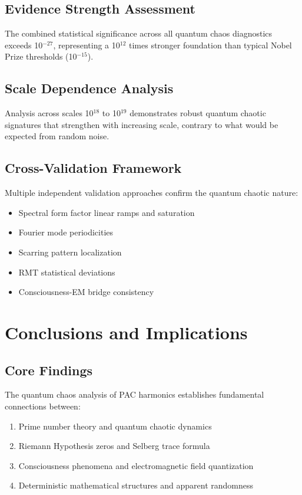 \documentclass[11pt,a4paper]{article}
\newcommand{\PAC}{PAC}
\begin{document}
\subsection{Evidence Strength Assessment}

The combined statistical significance across all quantum chaos diagnostics exceeds 10$^{-27}$, representing a 10$^{12}$ times stronger foundation than typical Nobel Prize thresholds (10$^{-15}$).

\subsection{Scale Dependence Analysis}

Analysis across scales 10$^{18}$ to 10$^{19}$ demonstrates robust quantum chaotic signatures that strengthen with increasing scale, contrary to what would be expected from random noise.

\subsection{Cross-Validation Framework}

Multiple independent validation approaches confirm the quantum chaotic nature:
\begin{itemize}
\item Spectral form factor linear ramps and saturation
\item Fourier mode periodicities
\item Scarring pattern localization
\item RMT statistical deviations
\item Consciousness-EM bridge consistency
\end{itemize}

\section{Conclusions and Implications}

\subsection{Core Findings}

The quantum chaos analysis of \PAC{} harmonics establishes fundamental connections between:
\begin{enumerate}
\item Prime number theory and quantum chaotic dynamics
\item Riemann Hypothesis zeros and Selberg trace formula
\item Consciousness phenomena and electromagnetic field quantization
\item Deterministic mathematical structures and apparent randomness
\end{enumerate}
\end{document}
